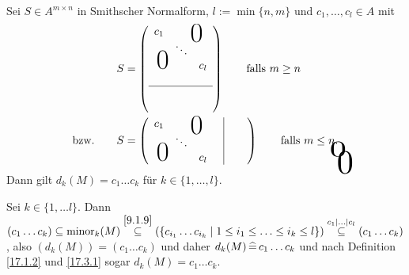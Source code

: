 \documentclass[../../main.tex]{subfiles}
\begin{document}
\begin{lem}\label{17.3.4}
    Sei $S\in A^{m\times n}$ in Smithscher Normalform, $l:=\min\{n,m\}$ und $c_1,\ldots ,c_l\in A$ mit 
    \begin{align*}
        &S=\left(
            \begin{array}{c c c}
                c_1& \multicolumn{2}{c}{\text{\kern 1em\smash{\raisebox{-1.5ex}{\Huge 0}}}} \\
                & \ddots &  \\
                \multicolumn{2}{c}{\text{\kern-1.5em\smash{\raisebox{0ex}{\Huge 0}}}} &c_l\\
                & &\\
                \hline 
                &\tikz[remember picture]\node[inner sep=0pt] (a){ };&\\
                & &
            \end{array}
        \right)\qquad\text{falls }m\ge n\\
        \text{bzw.}\qquad&S=\left(
            \begin{array}{c c c c|c c}
                c_1& \multicolumn{2}{c}{\text{\kern 1em\smash{\raisebox{-1.5ex}{\Huge 0}}}}& &\tikz[remember picture]\node[inner sep=0pt] (b){ }; &\\
                & \ddots & & \\
                \multicolumn{2}{c}{\text{\kern-1.5em\smash{\raisebox{0ex}{\Huge 0}}}}& c_l& &\\
            \end{array}
        \right)\qquad\text{falls }m\le n.
        \begin{tikzpicture}[overlay, remember picture]
            \node at (a.north) [anchor=center,yshift=-0.2cm, yscale=2,xscale=3] {$0$};
            \node at (b.east) [anchor=center, xshift=0.2cm,yshift=-0.6cm,  xscale=3, yscale=3] {$0$};
        \end{tikzpicture}
    \end{align*}
    Dann gilt $d_k(M)=c_1\ldots c_k$ für $k\in\{1,\ldots ,l\}$.
\end{lem}
\begin{cproof}
    Sei $k\in\{1,\ldots l\}$. Dann $(c_1\ldots c_k)\subseteq \operatorname{minor}_k(M)\stackrel{\ref{9.1.9}}{\subseteq}(\{c_{i_1}\ldots c_{i_k}\mid 1\le i_1\le\ldots \le i_k\le l\})\stackrel{c_1\mid\ldots \mid c_l}{\subseteq}(c_1\ldots c_k)$, also $(d_k(M))=(c_1\ldots c_k)$ und daher $d_k(M)\,\widehat{=}\, c_1\ldots c_k$ und nach Definition \ref{17.1.2} und \ref{17.3.1} sogar $d_k(M)=c_1\ldots c_k$.
\end{cproof}
\end{document}
